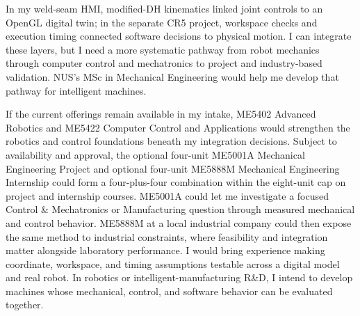 In my weld-seam HMI, modified-DH kinematics linked joint controls to an OpenGL digital twin; in the separate CR5 project, workspace checks and execution timing connected software decisions to physical motion. I can integrate these layers, but I need a more systematic pathway from robot mechanics through computer control and mechatronics to project and industry-based validation. NUS's MSc in Mechanical Engineering would help me develop that pathway for intelligent machines.

If the current offerings remain available in my intake, ME5402 Advanced Robotics and ME5422 Computer Control and Applications would strengthen the robotics and control foundations beneath my integration decisions. Subject to availability and approval, the optional four-unit ME5001A Mechanical Engineering Project and optional four-unit ME5888M Mechanical Engineering Internship could form a four-plus-four combination within the eight-unit cap on project and internship courses. ME5001A could let me investigate a focused Control \& Mechatronics or Manufacturing question through measured mechanical and control behavior. ME5888M at a local industrial company could then expose the same method to industrial constraints, where feasibility and integration matter alongside laboratory performance. I would bring experience making coordinate, workspace, and timing assumptions testable across a digital model and real robot. In robotics or intelligent-manufacturing R\&D, I intend to develop machines whose mechanical, control, and software behavior can be evaluated together.
